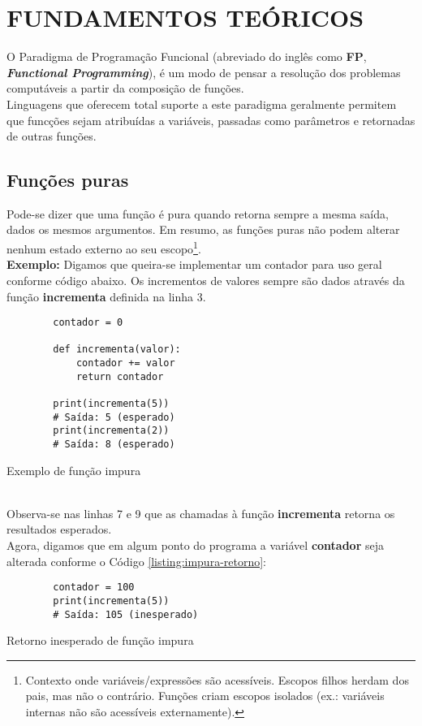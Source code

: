 \section{FUNDAMENTOS TEÓRICOS}
O Paradigma de Programação Funcional (abreviado do inglês como \textbf{FP}, \textit{\textbf{Functional Programming}}), é um modo de pensar
a resolução dos problemas computáveis a partir da composição de funções\cite{queiroz_func_prog}.\\
Linguagens que oferecem total suporte a este paradigma geralmente permitem que funcções sejam atribuídas a variáveis, passadas como parâmetros
e retornadas de outras funções.
\subsection{Funções puras}
Pode-se dizer que uma função é pura quando retorna sempre a mesma saída, dados os mesmos argumentos\cite{queiroz_func_prog}. Em resumo, as funções
puras não podem alterar nenhum estado externo ao seu escopo\footnote{Contexto onde variáveis/expressões são acessíveis. Escopos filhos herdam dos pais, mas não o contrário. Funções criam escopos isolados (ex.: variáveis internas não são acessíveis externamente)\cite{mdn_escopo}.}.\\
\textbf{Exemplo:}
Digamos que queira-se implementar um contador para uso geral conforme código abaixo. Os incrementos de valores sempre são dados através da função
\textbf{incrementa} definida na linha 3.
\begin{listing}[!ht]
    \begin{verbatim}
        contador = 0

        def incrementa(valor):
            contador += valor
            return contador

        print(incrementa(5))
        # Saída: 5 (esperado)
        print(incrementa(2))
        # Saída: 8 (esperado)
    \end{verbatim}
    \caption{Exemplo de função impura}
    \label{listing:impura}
\end{listing}
\\Observa-se nas linhas 7 e 9 que as chamadas à função \textbf{incrementa} retorna os resultados esperados.\\
Agora, digamos que em algum ponto do programa a variável \textbf{contador} seja alterada conforme o
Código \ref{listing:impura-retorno}:

\begin{listing}[!ht]
    \begin{verbatim}
        contador = 100
        print(incrementa(5))
        # Saída: 105 (inesperado)
    \end{verbatim}
    \caption{Retorno inesperado de função impura}
    \label{listing:impura-retorno}
\end{listing}\pagebreak

